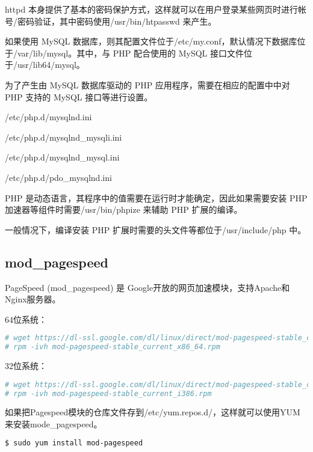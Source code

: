 httpd 本身提供了基本的密码保护方式，这样就可以在用户登录某些网页时进行帐号/密码验证，其中密码使用/usr/bin/htpasswd 来产生。

如果使用 MySQL 数据库，则其配置文件位于/etc/my.conf，默认情况下数据库位于/var/lib/mysql。其中，与 PHP 配合使用的 MySQL 接口文件位于/usr/lib64/mysql。

为了产生由 MySQL 数据库驱动的 PHP 应用程序，需要在相应的配置中中对 PHP 支持的 MySQL 接口等进行设置。

\begin{compactitem}
\item /etc/php.d/mysqlnd.ini
\item /etc/php.d/mysqlnd\_mysqli.ini
\item /etc/php.d/mysqlnd\_mysql.ini
\item /etc/php.d/pdo\_mysqlnd.ini
\end{compactitem}

PHP 是动态语言，其程序中的值需要在运行时才能确定，因此如果需要安装 PHP 加速器等组件时需要/usr/bin/phpize 来辅助 PHP 扩展的编译。

一般情况下，编译安装 PHP 扩展时需要的头文件等都位于/usr/include/php 中。


\subsection{mod\_pagespeed}


PageSpeed (mod\_pagespeed) 是 Google开放的网页加速模块，支持Apache和Nginx服务器。 

64位系统：

\begin{lstlisting}[language=bash]
# wget https://dl-ssl.google.com/dl/linux/direct/mod-pagespeed-stable_current_x86_64.rpm
# rpm -ivh mod-pagespeed-stable_current_x86_64.rpm
\end{lstlisting}

32位系统：


\begin{lstlisting}[language=bash]
# wget https://dl-ssl.google.com/dl/linux/direct/mod-pagespeed-stable_current_i386.rpm
# rpm -ivh mod-pagespeed-stable_current_i386.rpm
\end{lstlisting}


如果把Pagespeed模块的仓库文件存到/etc/yum.repos.d/，这样就可以使用YUM来安装mode\_pagespeed。

\begin{lstlisting}[language=bash]
$ sudo yum install mod-pagespeed
\end{lstlisting}

